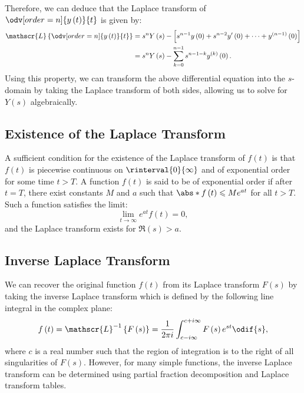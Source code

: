 \documentclass{article}
\begin{document}
Therefore, we can deduce that the Laplace transform of
\(\displaystyle \odv[order=n]{y\left( t \right)}{t}\) is given by:
\begin{align*}
    \mathscr{L}\left\{ \odv[order=n]{y\left( t \right)}{t} \right\} & = s^n Y\left( s \right) - \left[ s^{n-1} y\left( 0 \right) + s^{n-2} y'\left( 0 \right) + \cdots + y^{\left( n-1 \right)}\left( 0 \right) \right] \\
                                                                    & = s^n Y\left( s \right) - \sum_{k=0}^{n-1} s^{n-1-k} y^{\left( k \right)}\left( 0 \right).
\end{align*}
Using this property, we can transform the above differential equation
into the \(s\)-domain by taking the Laplace transform of both sides,
allowing us to solve for \(Y\left( s \right)\) algebraically.
\subsection{Existence of the Laplace Transform}
A sufficient condition for the existence of the Laplace transform of
\(f\left( t \right)\) is that \(f\left( t \right)\) is piecewise
continuous on \(\rinterval{0}{\infty}\) and of exponential order for
some time \(t > T\). A function \(f\left( t \right)\) is said to be of
exponential order if after \(t = T\), there exist constants \(M\) and
\(a\) such that \(\abs*{f\left( t \right)} \leqslant M e^{at}\) for all
\(t > T\). Such a function satisfies the limit:
\begin{equation*}
    \lim_{t \to \infty} e^{at} f\left( t \right) = 0,
\end{equation*}
and the Laplace transform exists for \(\Re\left( s \right) > a\).
\subsection{Inverse Laplace Transform}
We can recover the original function \(f\left( t \right)\) from its
Laplace transform \(F\left( s \right)\) by taking the inverse Laplace
transform which is defined by the following line integral in the
complex plane:
\begin{equation*}
    f\left( t \right) = \mathscr{L}^{-1}\left\{ F\left( s \right) \right\} = \frac{1}{2\pi i} \int_{c - i \infty}^{c + i \infty} F\left( s \right) e^{st} \odif{s},
\end{equation*}
where \(c\) is a real number such that the region of integration is to
the right of all singularities of \(F\left( s \right)\). However, for
many simple functions, the inverse Laplace transform can be determined
using partial fraction decomposition and Laplace transform tables.
\end{document}
